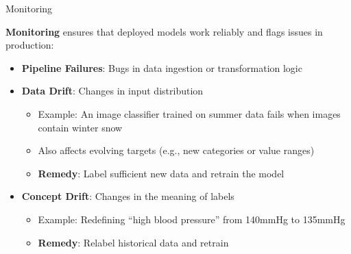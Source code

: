 \documentclass[10pt,compress,t,notes=noshow, xcolor=table]{beamer}
\begin{document}







\begin{frame}{Monitoring}
\label{monitoring}

\textbf{Monitoring} ensures that deployed models work reliably and flags issues in production:

\begin{itemize}
  \item \textbf{Pipeline Failures}: Bugs in data ingestion or transformation logic
  \item \textbf{Data Drift}: Changes in input distribution
    \begin{itemize}
      \item Example: An image classifier trained on summer data fails when images contain winter snow
      \item Also affects evolving targets (e.g., new categories or value ranges)
      \item \textbf{Remedy}: Label sufficient new data and retrain the model
    \end{itemize}
  \item \textbf{Concept Drift}: Changes in the meaning of labels
    \begin{itemize}
      \item Example: Redefining “high blood pressure” from 140mmHg to 135mmHg
      \item \textbf{Remedy}: Relabel historical data and retrain
    \end{itemize}
\end{itemize}
\end{frame}
\end{document}
